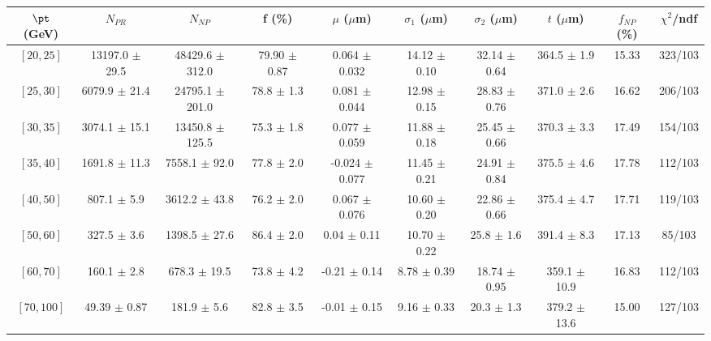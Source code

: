 \begin{tabular}{c||c|c|c|c|c|c|c||c|c}
$\pt$ (GeV) & $N_{PR}$ & $N_{NP}$ & f (\%) & $\mu$ ($\mu$m) & $\sigma_1$ ($\mu$m) & $\sigma_2$ ($\mu$m)  & $t$ ($\mu$m) & $f_{NP}$ (\%) & $\chi^2$/ndf \\
\hline
$[20, 25]$ & 13197.0 $\pm$ 29.5 & 48429.6 $\pm$ 312.0 & 79.90 $\pm$ 0.87 & 0.064 $\pm$ 0.032 & 14.12 $\pm$ 0.10 & 32.14 $\pm$ 0.64 & 364.5 $\pm$ 1.9 & 15.33 & 323/103\\
$[25, 30]$ & 6079.9 $\pm$ 21.4 & 24795.1 $\pm$ 201.0 & 78.8 $\pm$ 1.3 & 0.081 $\pm$ 0.044 & 12.98 $\pm$ 0.15 & 28.83 $\pm$ 0.76 & 371.0 $\pm$ 2.6 & 16.62 & 206/103\\
$[30, 35]$ & 3074.1 $\pm$ 15.1 & 13450.8 $\pm$ 125.5 & 75.3 $\pm$ 1.8 & 0.077 $\pm$ 0.059 & 11.88 $\pm$ 0.18 & 25.45 $\pm$ 0.66 & 370.3 $\pm$ 3.3 & 17.49 & 154/103\\
$[35, 40]$ & 1691.8 $\pm$ 11.3 & 7558.1 $\pm$ 92.0 & 77.8 $\pm$ 2.0 & -0.024 $\pm$ 0.077 & 11.45 $\pm$ 0.21 & 24.91 $\pm$ 0.84 & 375.5 $\pm$ 4.6 & 17.78 & 112/103\\
$[40, 50]$ & 807.1 $\pm$ 5.9 & 3612.2 $\pm$ 43.8 & 76.2 $\pm$ 2.0 & 0.067 $\pm$ 0.076 & 10.60 $\pm$ 0.20 & 22.86 $\pm$ 0.66 & 375.4 $\pm$ 4.7 & 17.71 & 119/103\\
$[50, 60]$ & 327.5 $\pm$ 3.6 & 1398.5 $\pm$ 27.6 & 86.4 $\pm$ 2.0 & 0.04 $\pm$ 0.11 & 10.70 $\pm$ 0.22 & 25.8 $\pm$ 1.6 & 391.4 $\pm$ 8.3 & 17.13 & 85/103\\
$[60, 70]$ & 160.1 $\pm$ 2.8 & 678.3 $\pm$ 19.5 & 73.8 $\pm$ 4.2 & -0.21 $\pm$ 0.14 & 8.78 $\pm$ 0.39 & 18.74 $\pm$ 0.95 & 359.1 $\pm$ 10.9 & 16.83 & 112/103\\
$[70, 100]$ & 49.39 $\pm$ 0.87 & 181.9 $\pm$ 5.6 & 82.8 $\pm$ 3.5 & -0.01 $\pm$ 0.15 & 9.16 $\pm$ 0.33 & 20.3 $\pm$ 1.3 & 379.2 $\pm$ 13.6 & 15.00 & 127/103\\
\end{tabular}
